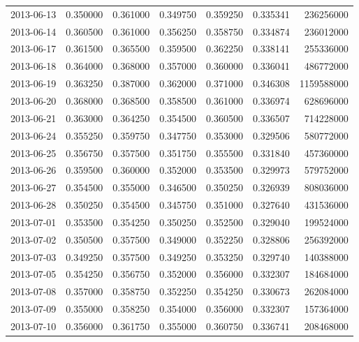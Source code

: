 \begin{tabular}{lrrrrrr}
2013-06-13 &    0.350000 &    0.361000 &    0.349750 &    0.359250 &    0.335341 &   236256000 \\
2013-06-14 &    0.360500 &    0.361000 &    0.356250 &    0.358750 &    0.334874 &   236012000 \\
2013-06-17 &    0.361500 &    0.365500 &    0.359500 &    0.362250 &    0.338141 &   255336000 \\
2013-06-18 &    0.364000 &    0.368000 &    0.357000 &    0.360000 &    0.336041 &   486772000 \\
2013-06-19 &    0.363250 &    0.387000 &    0.362000 &    0.371000 &    0.346308 &  1159588000 \\
2013-06-20 &    0.368000 &    0.368500 &    0.358500 &    0.361000 &    0.336974 &   628696000 \\
2013-06-21 &    0.363000 &    0.364250 &    0.354500 &    0.360500 &    0.336507 &   714228000 \\
2013-06-24 &    0.355250 &    0.359750 &    0.347750 &    0.353000 &    0.329506 &   580772000 \\
2013-06-25 &    0.356750 &    0.357500 &    0.351750 &    0.355500 &    0.331840 &   457360000 \\
2013-06-26 &    0.359500 &    0.360000 &    0.352000 &    0.353500 &    0.329973 &   579752000 \\
2013-06-27 &    0.354500 &    0.355000 &    0.346500 &    0.350250 &    0.326939 &   808036000 \\
2013-06-28 &    0.350250 &    0.354500 &    0.345750 &    0.351000 &    0.327640 &   431536000 \\
2013-07-01 &    0.353500 &    0.354250 &    0.350250 &    0.352500 &    0.329040 &   199524000 \\
2013-07-02 &    0.350500 &    0.357500 &    0.349000 &    0.352250 &    0.328806 &   256392000 \\
2013-07-03 &    0.349250 &    0.357500 &    0.349250 &    0.353250 &    0.329740 &   140388000 \\
2013-07-05 &    0.354250 &    0.356750 &    0.352000 &    0.356000 &    0.332307 &   184684000 \\
2013-07-08 &    0.357000 &    0.358750 &    0.352250 &    0.354250 &    0.330673 &   262084000 \\
2013-07-09 &    0.355000 &    0.358250 &    0.354000 &    0.356000 &    0.332307 &   157364000 \\
2013-07-10 &    0.356000 &    0.361750 &    0.355000 &    0.360750 &    0.336741 &   208468000 \\

\end{tabular}
